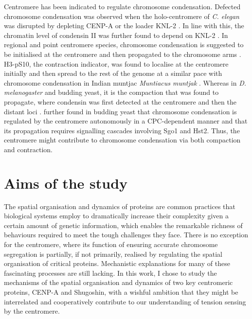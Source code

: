 Centromere has been indicated to regulate chromosome condensation. Defected chromosome condensation was observed when the holo-centromere of \textit{C. elegan} was disrupted by depleting CENP-A or the loader KNL-2 \citep{Chan2004CondensinDivisions, Maddox2006MolecularAssay, Hagstrom2002C.Meiosis, Maddox2007FunctionalChromatin}. In line with this, the chromatin level of condensin II was further found to depend on KNL-2 \citep{Wenda2021MitoticElegans}. In regional and point centromere species, chromosome condensation is suggested to be initialised at the centromere and then propagated to the chromosome arms \citep{Kruitwagen2018}. H3-pS10, the contraction indicator, was found to localise at the centromere initially and then spread to the rest of the genome at a similar pace with chromosome condensation in Indian muntjac \textit{Muntiacus muntjak} \citep{Hendzel1997Mitosis-specificCondensation}. Whereas in \textit{D. melanogaster} and budding yeast, it is the compaction that was found to propagate, where condensin was first detected at the centromere and then the distant loci \citep{Oliveira2007CondensinChromosomes, Leonard2015}. \cite{Kruitwagen2018} further found in budding yeast that chromosome condensation is regulated by the centromere autonomously in a CPC-dependent manner and that its propagation requires signalling cascades involving Sgo1 and Hst2. Thus, the centromere might contribute to chromosome condensation via both compaction and contraction. 

\section{Aims of the study}

The spatial organisation and dynamics of proteins are common practices that biological systems employ to dramatically increase their complexity given a certain amount of genetic information, which enables the remarkable richness of behaviours required to meet the tough challenges they face. There is no exception for the centromere, where its function of ensuring accurate chromosome segregation is partially, if not primarily, realised by regulating the spatial organisation of critical proteins. Mechanistic explanations for many of these fascinating processes are still lacking. In this work, I chose to study the mechanisms of the spatial organisation and dynamics of two key centromeric proteins, CENP-A and Shugoshin, with a wishful ambition that they might be interrelated and cooperatively contribute to our understanding of tension sensing by the centromere. 

